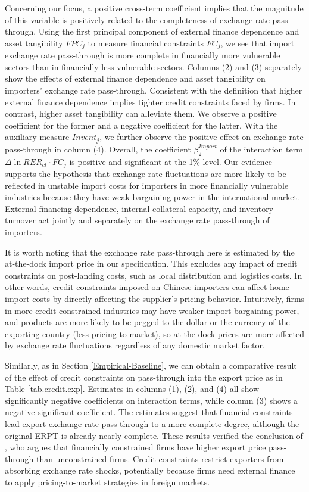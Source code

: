 \documentclass[12pt]{article}
\begin{document}
Concerning our focus, a positive cross-term coefficient implies that the magnitude of this variable is positively related to the completeness of exchange rate pass-through. Using the first principal component of external finance dependence and asset tangibility $FPC_j$ to measure financial constraints $FC_j$, we see that import exchange rate pass-through is more complete in financially more vulnerable sectors than in financially less vulnerable sectors. Columns (2) and (3) separately show the effects of external finance dependence and asset tangibility on importers' exchange rate pass-through. Consistent with the definition that higher external finance dependence implies tighter credit constraints faced by firms. In contrast, higher asset tangibility can alleviate them. We observe a positive coefficient for the former and a negative coefficient for the latter. With the auxiliary measure $Invent_j$, we further observe the positive effect on exchange rate pass-through in column (4). Overall, the coefficient $\beta^{Import}_2$ of the interaction term $\Delta \ln RER_{ct} \cdot FC_{j}$ is positive and significant at the 1\% level. Our evidence supports the hypothesis that exchange rate fluctuations are more likely to be reflected in unstable import costs for importers in more financially vulnerable industries because they have weak bargaining power in the international market. External financing dependence, internal collateral capacity, and inventory turnover act jointly and separately on the exchange rate pass-through of importers.

It is worth noting that the exchange rate pass-through here is estimated by the at-the-dock import price in our specification. This excludes any impact of credit constraints on post-landing costs, such as local distribution and logistics costs. In other words, credit constraints imposed on Chinese importers can affect home import costs by directly affecting the supplier's pricing behavior. Intuitively, firms in more credit-constrained industries may have weaker import bargaining power, and products are more likely to be pegged to the dollar or the currency of the exporting country (less pricing-to-market), so at-the-dock prices are more affected by exchange rate fluctuations regardless of any domestic market factor.

Similarly, as in Section \ref{Empirical-Baseline}, we can obtain a comparative result of the effect of credit constraints on pass-through into the export price as in Table \ref{tab.credit.exp}. Estimates in columns (1), (2), and (4) all show significantly negative coefficients on interaction terms, while column (3) shows a negative significant coefficient. The estimates suggest that financial constraints lead export exchange rate pass-through to a more complete degree, although the original ERPT is already nearly complete. These results verified the conclusion of \cite{strasser2013}, who argues that financially constrained firms have higher export price pass-through than unconstrained firms. Credit constraints restrict exporters from absorbing exchange rate shocks, potentially because firms need external finance to apply pricing-to-market strategies in foreign markets.
\end{document}
